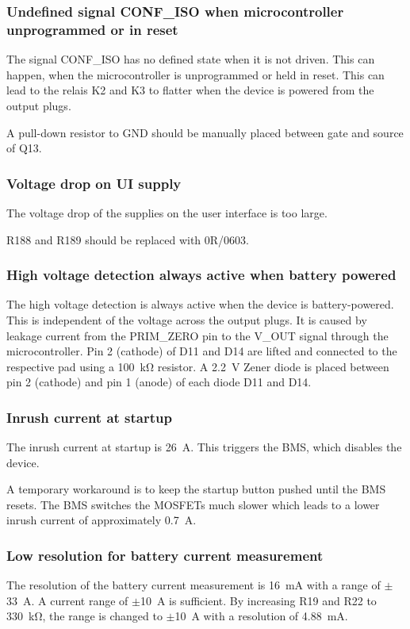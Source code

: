 \subsubsection{Undefined signal CONF\_ISO when microcontroller unprogrammed or in reset}
The signal CONF\_ISO has no defined state when it is not driven. This can happen, when the microcontroller is unprogrammed or held in reset. This can lead to the relais K2 and K3 to flatter when the device is powered from the output plugs. 

A pull-down resistor to GND should be manually placed between gate and source of Q13. 

\subsubsection{Voltage drop on UI supply}
The voltage drop of the supplies on the user interface is too large. 

R188 and R189 should be replaced with 0R/0603. 

\subsubsection{High voltage detection always active when battery powered}
The high voltage detection is always active when the device is battery-powered. This is independent of the voltage across the output plugs. It is caused by leakage current from the PRIM\_ZERO pin to the V\_OUT signal through the microcontroller. 
Pin 2 (cathode) of D11 and D14 are lifted and connected to the respective pad using a \qty{100}{\kilo\ohm} resistor. A \qty{2.2}{\volt} Zener diode is placed between pin 2 (cathode) and pin 1 (anode) of each diode D11 and D14. 

\subsubsection{Inrush current at startup}
The inrush current at startup is \qty{26}{\ampere}. This triggers the BMS, which disables the device. 

A temporary workaround is to keep the startup button pushed until the BMS resets. The BMS switches the \acp{MOSFET} much slower which leads to a lower inrush current of approximately \qty{0.7}{\ampere}. 


\subsubsection{Low resolution for battery current measurement}
The resolution of the battery current measurement is \qty{16}{\milli\ampere} with a range of $\pm$\qty{33}{\ampere}. A current range of $\pm$\qty{10}{\ampere} is sufficient. By increasing R19 and R22 to \qty{330}{\kilo\ohm}, the range is changed to $\pm$\qty{10}{\ampere} with a resolution of \qty{4.88}{\milli\ampere}. 

